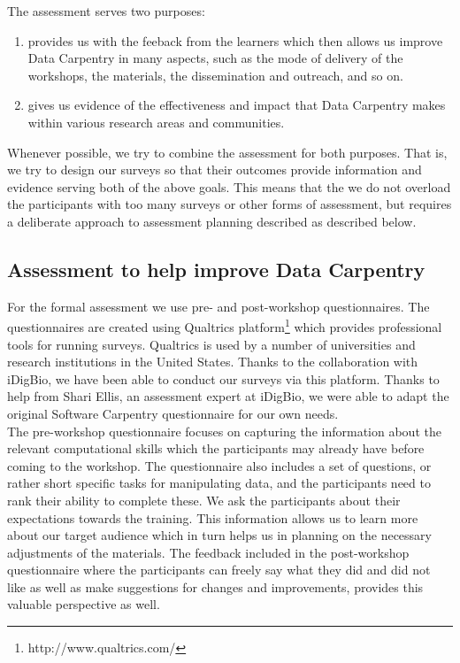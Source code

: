 \documentclass[15]{idcc}
\begin{document}
\begin{itemize}
The assessment serves two purposes:
\begin{enumerate}
\item provides us with the feeback from the learners which then allows us improve Data Carpentry in many aspects, such as the mode of
delivery of the workshops, the materials, the dissemination and outreach, and so on.
\item gives us evidence of the effectiveness and impact that Data Carpentry makes within various research areas and communities.
\end{enumerate}

Whenever possible, we try to combine the assessment for both purposes. That is, we try to design our surveys so that their outcomes provide
information and evidence serving both of the above goals. This means that the we do not overload the participants with too many surveys
or other forms of assessment, but requires a deliberate approach to assessment planning described as described below.


\subsection{Assessment to help improve Data Carpentry}
For the formal assessment we use pre- and post-workshop questionnaires. The questionnaires are created using Qualtrics platform\footnote{http://www.qualtrics.com/}
which provides professional tools for running surveys. Qualtrics is used by a number of universities and research institutions in the United States.
Thanks to the collaboration with iDigBio, we have been able to conduct our surveys via this platform. Thanks to help from Shari Ellis, an
 assessment expert at iDigBio, we were able to adapt the original Software Carpentry questionnaire for our own needs. \\

The pre-workshop questionnaire focuses on capturing the information about the relevant computational skills which the participants may already
have before coming to the workshop. The questionnaire also includes
a set of questions, or rather short specific tasks for manipulating data, and the participants need to rank their ability to complete these.
We ask the participants about their expectations towards the training. This information allows us to learn more about our target audience which
in turn helps us in planning on the necessary adjustments of the materials. The feedback included in the post-workshop questionnaire
where the participants can freely say what they did and did not like as well as  make suggestions for changes and improvements, provides this
valuable perspective as well. \\


\end{itemize}
\end{document}
